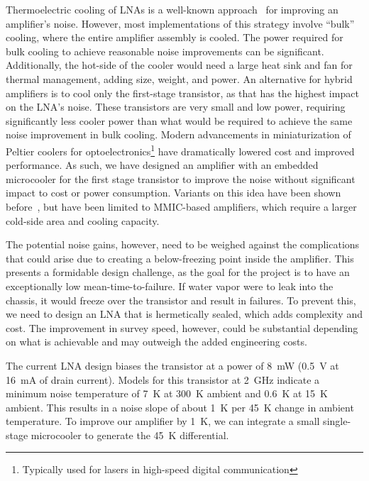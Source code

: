 Thermoelectric cooling of LNAs is a well-known approach~\cite{caoCoolingLowNoise2013} for improving an amplifier's noise.
However, most implementations of this strategy involve ``bulk'' cooling, where the entire amplifier assembly is cooled.
The power required for bulk cooling to achieve reasonable noise improvements can be significant.
Additionally, the hot-side of the cooler would need a large heat sink and fan for thermal management, adding size, weight, and power.
An alternative for hybrid amplifiers is to cool only the first-stage transistor, as that has the highest impact on the LNA's noise.
These transistors are very small and low power, requiring significantly less cooler power than what would be required to achieve the same noise improvement in bulk cooling.
Modern advancements in miniaturization of Peltier coolers for optoelectronics\footnote{Typically used for lasers in high-speed digital communication} have dramatically lowered cost and improved performance.
As such, we have designed an amplifier with an embedded microcooler for the first stage transistor to improve the noise without significant impact to cost or power consumption.
Variants on this idea have been shown before~\cite{schreuderLocalizedLNAVooling2006}, but have been limited to MMIC-based amplifiers, which require a larger cold-side area and cooling capacity.

The potential noise gains, however, need to be weighed against the complications that could arise due to creating a below-freezing point inside the amplifier.
This presents a formidable design challenge, as the goal for the project is to have an exceptionally low mean-time-to-failure.
If water vapor were to leak into the chassis, it would freeze over the transistor and result in failures.
To prevent this, we need to design an LNA that is hermetically sealed, which adds complexity and cost.
The improvement in survey speed, however, could be substantial depending on what is achievable and may outweigh the added engineering costs.

The current LNA design biases the transistor at a power of \qty{8}{\mW} (\qty{0.5}{\V} at \qty{16}{\mA} of drain current).
Models for this transistor at \qty{2}{\GHz} indicate a minimum noise temperature of \qty{7}{\K} at \qty{300}{\K} ambient and \qty{0.6}{\K} at \qty{15}{\K} ambient.
This results in a noise slope of about \qty{1}{\K} per \qty{45}{\K} change in ambient temperature.
To improve our amplifier by \qty{1}{\K}, we can integrate a small single-stage microcooler to generate the \qty{45}{\K} differential.

